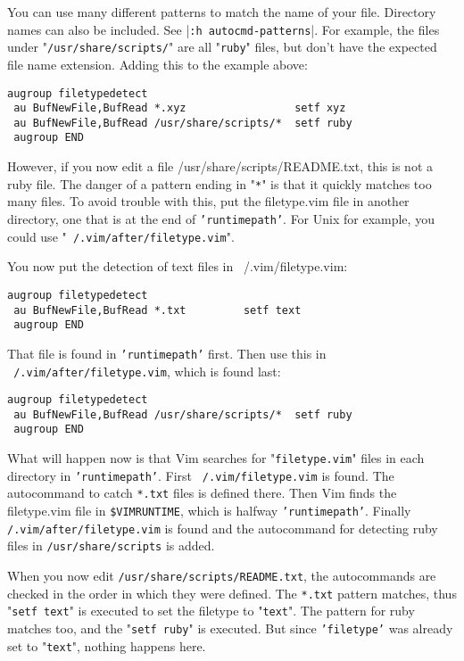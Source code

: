 You can use many different patterns to match the name of your file.
Directory names can also be included.
See |\texttt{:h autocmd-patterns}|.
For example, the files under "\texttt{/usr/share/scripts/}" are all "\texttt{ruby}" files, but don't have the expected file name extension.
Adding this to the example above:

\begin{Verbatim}[samepage=true]
 augroup filetypedetect
 au BufNewFile,BufRead *.xyz                 setf xyz
 au BufNewFile,BufRead /usr/share/scripts/*  setf ruby
 augroup END
\end{Verbatim}

However, if you now edit a file /usr/share/scripts/README.txt, this is not a
ruby file.  The danger of a pattern ending in "\texttt{*}" is that it quickly matches
too many files.  To avoid trouble with this, put the filetype.vim file in
another directory, one that is at the end of \texttt{'runtimepath'}.  For Unix for
example, you could use "\texttt{~/.vim/after/filetype.vim}".

You now put the detection of text files in ~/.vim/filetype.vim:

\begin{Verbatim}[samepage=true]
 augroup filetypedetect
 au BufNewFile,BufRead *.txt         setf text
 augroup END
\end{Verbatim}

That file is found in \texttt{'runtimepath'} first.
Then use this in \texttt{~/.vim/after/filetype.vim}, which is found last:

\begin{Verbatim}[samepage=true]
 augroup filetypedetect
 au BufNewFile,BufRead /usr/share/scripts/*  setf ruby
 augroup END
\end{Verbatim}

What will happen now is that Vim searches for "\texttt{filetype.vim}" files in each directory in \texttt{'runtimepath'}.
First \texttt{~/.vim/filetype.vim} is found.
The autocommand to catch \texttt{*.txt} files is defined there.
Then Vim finds the filetype.vim file in \texttt{\$VIMRUNTIME}, which is halfway \texttt{'runtimepath'}.
Finally \texttt{/.vim/after/filetype.vim} is found and the autocommand for detecting ruby files in \texttt{/usr/share/scripts} is added.

When you now edit \texttt{/usr/share/scripts/README.txt}, the autocommands are checked in the order in which they were defined.
The \texttt{*.txt} pattern matches, thus "\texttt{setf text}" is executed to set the filetype to "\texttt{text}".
The pattern for ruby matches too, and the "\texttt{setf ruby}" is executed.
But since \texttt{'filetype'} was already set to "\texttt{text}", nothing happens here.

